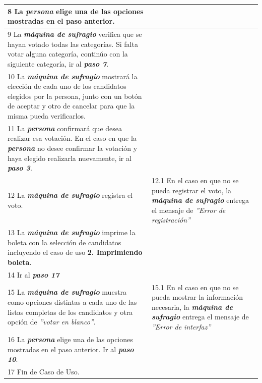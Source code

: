 \documentclass[spanish, 10pt,a4paper]{article}
\numberwithin{equation}{section} %
\begin{document}
\begin{table}[H]
\begin{tabular}{p{9cm} | p{7cm}}
    \hline
    8 La \textbf{\textit{persona}} elige una de las opciones mostradas en el paso anterior.
    & \\
    
    \hline
    9 La \textbf{\textit{máquina de sufragio}} verifica que se hayan votado todas las categorías. Si falta votar alguna categoría, continúo con la siguiente categoría, ir al \textbf{\textit{paso 7}}.
    & \\
    
    \hline
    10 La \textbf{\textit{máquina de sufragio}} mostrará la elección de cada uno de los candidatos elegidos por la persona, junto con un botón de aceptar y otro de cancelar para que la misma pueda verificarlos.
    & \\
    
    \hline
    11 La \textbf{\textit{persona}} confirmará que desea realizar esa votación.
     En el caso en que la \textbf{\textit{persona}} no desee confirmar la votación y haya elegido realizarla nuevamente, ir al \textbf{\textit{paso 3}}.\\
    
    \hline
    12 La \textbf{\textit{máquina de sufragio}} registra el voto.
    & 
    12.1 En el caso en que no se pueda registrar el voto, la \textbf{\textit{máquina de sufragio}} entrega el mensaje de \textit{''Error de registración''}
    \\
    
    \hline
    13 La \textbf{\textit{máquina de sufragio}} imprime la boleta con la selección de candidatos incluyendo el caso de uso \textbf{2. Imprimiendo boleta}.
    & 
    \\
    
    \hline
    14 Ir al  \textbf{\textit{paso 17}}
    & \\
    
    \hline
    15 La \textbf{\textit{máquina de sufragio}} muestra como opciones distintas a cada uno de las listas completas de los candidatos y otra opción de \textit{''votar en blanco''}.
    & 
    15.1 En el caso en que no se pueda mostrar la información necesaria, la \textbf{\textit{máquina de sufragio}} entrega el mensaje de \textit{''Error de interfaz''}
    \\
    
    \hline
    16 La \textbf{\textit{persona}} elige una de las opciones mostradas en el paso anterior. Ir al \textbf{\textit{paso 10}}.
    & \\
    \hline

    \hline
    17 Fin de Caso de Uso.
    & \\
  \end{tabular}
\egroup
\end{table}
\end{document}
